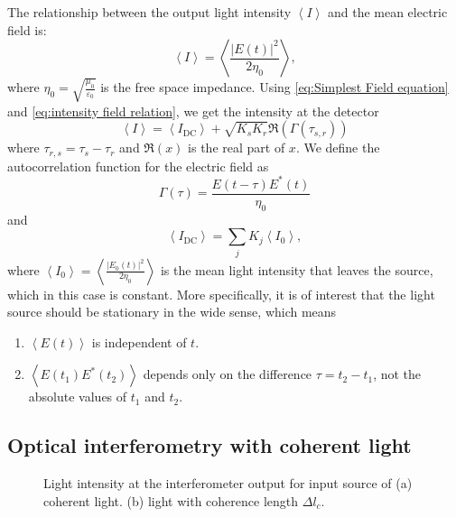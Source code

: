 \documentclass[12pt,twoside,english]{book}
\renewcommand{\~}{\perispomeni}%
\numberwithin{equation}{section}
\numberwithin{figure}{section}
\begin{document}
The relationship between the output light intensity $\left\langle I\right\rangle $ and the mean electric field is:
\begin{equation}
\left\langle I\right\rangle =\left\langle \frac{\left|E\left(t\right)\right|^{2}}{2\eta_{0}}\right\rangle ,\label{eq:intensity field relation}
\end{equation}
where $\eta_{0}=\sqrt{\frac{\mu_{0}}{\varepsilon_{0}}}$ is the free space impedance. Using \ref{eq:Simplest Field equation} and \ref{eq:intensity field relation}, we get the intensity at the detector 
\begin{equation}
\left\langle I\right\rangle =\left\langle I_{\text{DC}}\right\rangle +\sqrt{K_{s}K_{r}}\Re\left(\Gamma\left(\tau_{s,r}\right)\right)\label{eq:michelson output intensity equation}
\end{equation}
where $\tau_{r,s}=\tau_{s}-\tau_{r}$ and $\Re\left(x\right)$ is the real part of $x$. We define the autocorrelation function for the electric field as
\begin{equation}
\Gamma\left(\tau\right)=\frac{E\left(t-\tau\right)E^{*}\left(t\right)}{\eta_{0}}
\label{eq:autocorrelation definition}
\end{equation}
and
\begin{equation}
\left\langle I_{\text{DC}}\right\rangle =\sum_{j}K_{j}\left\langle I_{0}\right\rangle ,
\end{equation}
where $\left\langle I_{0}\right\rangle =\left\langle \frac{\left|E_{0}\left(t\right)\right|^{2}}{2\eta_{0}}\right\rangle $ is the mean light intensity that leaves the source, which in this case is constant. More specifically, it is of interest that the light source should be stationary in the wide sense, which means
\begin{enumerate}
\item $\left\langle E\left(t\right)\right\rangle $ is independent of $t$.
\item $\left\langle E\left(t_{1}\right)E^{*}\left(t_{2}\right)\right\rangle $
depends only on the difference $\tau=t_{2}-t_{1}$, not the absolute values of $t_1$ and $t_2$.
\end{enumerate}

\subsection{Optical interferometry with coherent light}

%
\begin{figure}[h]
\caption{Light intensity at the interferometer output for input source of (a)
coherent light. (b) light with coherence length $\Delta l_{c}$.\label{fig:interferometerGraphics}}

\end{figure}
\end{document}
